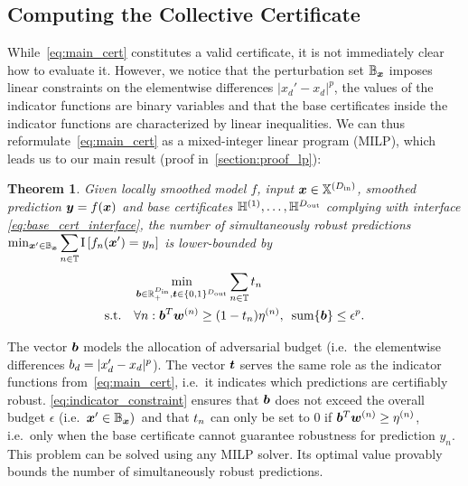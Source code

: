 \documentclass{article} %
\theoremstyle{plain}
\newtheorem{theorem}{Theorem}[section]
\theoremstyle{definition}
\theoremstyle{remark}
\begin{document}
\subsection{Computing the Collective Certificate}\label{section:computing_collective_cert}
While~\autoref{eq:main_cert} constitutes a valid certificate, it is not immediately clear how to evaluate it.
However, we notice that the perturbation set ${\mathbb{B}}_{\bm{x}}$ imposes linear constraints on the elementwise differences $|x_d' - x_d|^p$,  the values of the indicator functions are binary variables and that the base certificates inside the indicator functions are characterized by linear inequalities.
We can thus reformulate~\autoref{eq:main_cert} as a mixed-integer linear program (MILP), which leads us to our main result (proof in~\autoref{section:proof_lp}):
\begin{theorem}\label{theorem:collective_lp}
	Given locally smoothed model $f$, input ${\bm{x}} \in {\mathbb{X}}^{(D_\mathrm{in})}$, smoothed prediction ${\bm{y}} = f({\bm{x}})$ and base certificates ${\mathbb{H}}^{(1)},\dots,{\mathbb{H}}^{D_\mathrm{out}}$ complying with interface \autoref{eq:base_cert_interface}, the number of simultaneously robust predictions
	$\min_{\vx' \in \sB_\vx} \smashoperator{\sum_{n \in \sT}} \mathrm{I}\left[f_n(\vx') = \evy_n \right]$ is lower-bounded by \vskip -0.3in
	\begin{align}
		& \min_{{\bm{b}} \in {\mathbb{R}}_+^{D_\mathrm{in}}, {\bm{t}} \in \{0,1\}^{D_\mathrm{out}}} \sum_{n \in {\mathbb{T}}} {t}_n \quad \\
		\text{s.t.} \quad
		& \forall n: 
		{\bm{b}}^T {\bm{w}}^{(n)} \geq (1 - {t}_n) \eta^{(n)}, \label{eq:indicator_constraint} \enskip \mathrm{sum}\{{\bm{b}}\} \leq \epsilon^p.
	\end{align}
\end{theorem}
\vskip-0.1in
The vector ${\bm{b}}$ models the allocation of adversarial budget (i.e.\ the elementwise differences ${b}_d = |{x}'_d - {x}_d|^p$). The vector ${\bm{t}}$ serves the same role as the indicator functions from~\autoref{eq:main_cert}, i.e.\ it indicates which predictions are certifiably robust.
\autoref{eq:indicator_constraint} ensures that ${\bm{b}}$ does not exceed the overall budget $\epsilon$ (i.e.\ ${\bm{x}}' \in {\mathbb{B}}_{\bm{x}})$\ 
and that 
${t}_n$ can only be set to $0$ if ${\bm{b}}^T {\bm{w}}^{(n)}  \geq \eta^{(n)}$, i.e.~only when the base certificate cannot guarantee robustness for prediction $y_n$.
This problem can be solved using any MILP solver.
Its optimal value provably bounds the number of simultaneously robust predictions.
\end{document}
